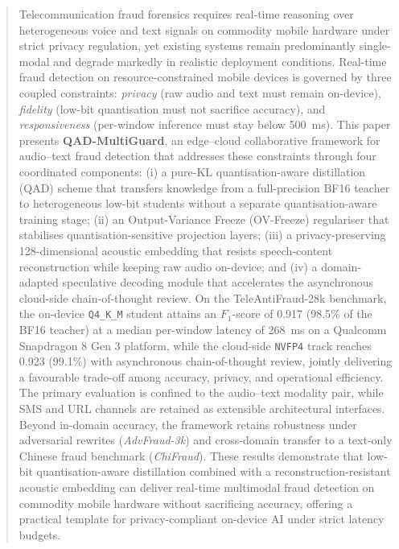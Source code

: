 \documentclass[a4paper,fleqn]{cas-sc}
\begin{document}
\begin{abstract}
Telecommunication fraud forensics requires real-time reasoning over heterogeneous voice and text signals on commodity mobile hardware under strict privacy regulation, yet existing systems remain predominantly single-modal and degrade markedly in realistic deployment conditions. Real-time fraud detection on resource-constrained mobile devices is governed by three coupled constraints: \textit{privacy} (raw audio and text must remain on-device), \textit{fidelity} (low-bit quantisation must not sacrifice accuracy), and \textit{responsiveness} (per-window inference must stay below 500~ms). This paper presents \textbf{QAD-MultiGuard}, an edge--cloud collaborative framework for audio--text fraud detection that addresses these constraints through four coordinated components: (i) a pure-KL quantisation-aware distillation (QAD) scheme that transfers knowledge from a full-precision BF16 teacher to heterogeneous low-bit students without a separate quantisation-aware training stage; (ii) an Output-Variance Freeze (OV-Freeze) regulariser that stabilises quantisation-sensitive projection layers; (iii) a privacy-preserving 128-dimensional acoustic embedding that resists speech-content reconstruction while keeping raw audio on-device; and (iv) a domain-adapted speculative decoding module that accelerates the asynchronous cloud-side chain-of-thought review. On the TeleAntiFraud-28k benchmark, the on-device \texttt{Q4\_K\_M} student attains an $F_1$-score of 0.917 (98.5\% of the BF16 teacher) at a median per-window latency of 268~ms on a Qualcomm Snapdragon 8 Gen 3 platform, while the cloud-side \texttt{NVFP4} track reaches 0.923 (99.1\%) with asynchronous chain-of-thought review, jointly delivering a favourable trade-off among accuracy, privacy, and operational efficiency. The primary evaluation is confined to the audio--text modality pair, while SMS and URL channels are retained as extensible architectural interfaces. Beyond in-domain accuracy, the framework retains robustness under adversarial rewrites (\textit{AdvFraud-3k}) and cross-domain transfer to a text-only Chinese fraud benchmark (\textit{ChiFraud}). These results demonstrate that low-bit quantisation-aware distillation combined with a reconstruction-resistant acoustic embedding can deliver real-time multimodal fraud detection on commodity mobile hardware without sacrificing accuracy, offering a practical template for privacy-compliant on-device AI under strict latency budgets.
\end{abstract}
\end{document}
